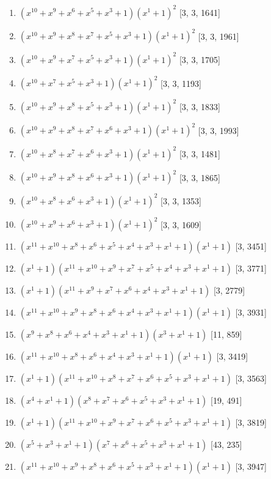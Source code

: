 \documentclass[10pt,twocolumn]{article}
\begin{document}
\begin{enumerate}
\item $(x^{10} + x^{9} + x^{6} + x^{5} + x^{3} + 1)(x^{1} + 1)^{2}$  [3, 3, 1641]
\item $(x^{10} + x^{9} + x^{8} + x^{7} + x^{5} + x^{3} + 1)(x^{1} + 1)^{2}$  [3, 3, 1961]
\item $(x^{10} + x^{9} + x^{7} + x^{5} + x^{3} + 1)(x^{1} + 1)^{2}$  [3, 3, 1705]
\item $(x^{10} + x^{7} + x^{5} + x^{3} + 1)(x^{1} + 1)^{2}$  [3, 3, 1193]
\item $(x^{10} + x^{9} + x^{8} + x^{5} + x^{3} + 1)(x^{1} + 1)^{2}$  [3, 3, 1833]
\item $(x^{10} + x^{9} + x^{8} + x^{7} + x^{6} + x^{3} + 1)(x^{1} + 1)^{2}$  [3, 3, 1993]
\item $(x^{10} + x^{8} + x^{7} + x^{6} + x^{3} + 1)(x^{1} + 1)^{2}$  [3, 3, 1481]
\item $(x^{10} + x^{9} + x^{8} + x^{6} + x^{3} + 1)(x^{1} + 1)^{2}$  [3, 3, 1865]
\item $(x^{10} + x^{8} + x^{6} + x^{3} + 1)(x^{1} + 1)^{2}$  [3, 3, 1353]
\item $(x^{10} + x^{9} + x^{6} + x^{3} + 1)(x^{1} + 1)^{2}$  [3, 3, 1609]
\item $(x^{11} + x^{10} + x^{8} + x^{6} + x^{5} + x^{4} + x^{3} + x^{1} + 1)(x^{1} + 1)$  [3, 3451]
\item $(x^{1} + 1)(x^{11} + x^{10} + x^{9} + x^{7} + x^{5} + x^{4} + x^{3} + x^{1} + 1)$  [3, 3771]
\item $(x^{1} + 1)(x^{11} + x^{9} + x^{7} + x^{6} + x^{4} + x^{3} + x^{1} + 1)$  [3, 2779]
\item $(x^{11} + x^{10} + x^{9} + x^{8} + x^{6} + x^{4} + x^{3} + x^{1} + 1)(x^{1} + 1)$  [3, 3931]
\item $(x^{9} + x^{8} + x^{6} + x^{4} + x^{3} + x^{1} + 1)(x^{3} + x^{1} + 1)$  [11, 859]
\item $(x^{11} + x^{10} + x^{8} + x^{6} + x^{4} + x^{3} + x^{1} + 1)(x^{1} + 1)$  [3, 3419]
\item $(x^{1} + 1)(x^{11} + x^{10} + x^{8} + x^{7} + x^{6} + x^{5} + x^{3} + x^{1} + 1)$  [3, 3563]
\item $(x^{4} + x^{1} + 1)(x^{8} + x^{7} + x^{6} + x^{5} + x^{3} + x^{1} + 1)$  [19, 491]
\item $(x^{1} + 1)(x^{11} + x^{10} + x^{9} + x^{7} + x^{6} + x^{5} + x^{3} + x^{1} + 1)$  [3, 3819]
\item $(x^{5} + x^{3} + x^{1} + 1)(x^{7} + x^{6} + x^{5} + x^{3} + x^{1} + 1)$  [43, 235]
\item $(x^{11} + x^{10} + x^{9} + x^{8} + x^{6} + x^{5} + x^{3} + x^{1} + 1)(x^{1} + 1)$  [3, 3947]

\end{enumerate}
\end{document}
